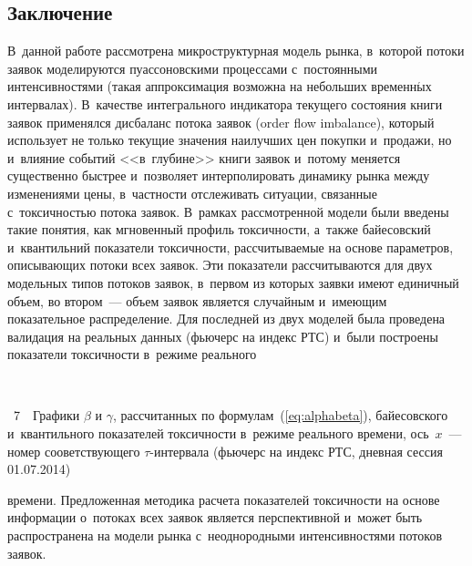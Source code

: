 \begin{multicols}{2}

\section{Заключение}

В~данной работе рассмотрена микроструктурная модель рынка,
в~которой потоки заявок моделируются пуассоновскими процессами
с~постоянными интенсивностями (такая аппроксимация возможна на
небольших временн$\acute{\mbox{ы}}$х интервалах). В~качестве интегрального индикатора
текущего состояния книги заявок применялся дисбаланс потока заявок
(order flow imbalance), который использует не только текущие значения
наилучших цен покупки и~продажи, но и~влияние событий <<в~глубине>>
книги заявок и~потому меняется существенно быст\-рее и~позволяет
интерполировать динамику рынка между изменениями цены, в~частности
отслеживать ситуации, связанные с~токсичностью потока заявок.
В~рамках рассмотренной модели были введены такие понятия,
как мгновенный профиль токсичности, а~так\-же байесовский и~квантильний
показатели токсичности, рассчитываемые на основе параметров, описывающих
потоки всех заявок. Эти показатели рассчитываются для двух модельных типов
потоков заявок, в~первом из которых заявки имеют единичный объем, во втором~---
объем заявок является случайным и~имеющим показательное распределение. Для
последней из двух моделей была проведена валидация на реальных данных
(фьючерс на индекс РТС) и~были построены показатели токсичности в~режиме
реального\linebreak\vspace*{-12pt}
\begin{center}  %
\vspace*{1pt}
 \mbox{%
 \epsfxsize=79.735mm
 }
\end{center}


\noindent
{{\figurename~7}\ \ \small{Графики $\beta$ и $\gamma$, рассчитанных по формулам~(\ref{eq:alphabeta}),
 байесовского и~квантильного показателей токсичности в~режиме реального времени,
 ось~$x$~--- номер сооветствующего $\tau$-ин\-тер\-ва\-ла
 (фьючерс на индекс РТС, дневная сессия 01.07.2014)}}

 \vspace*{13pt}




\noindent
 времени. Предложенная методика расчета показателей токсичности
на основе информации о~потоках всех заявок является перспективной и~может
быть распространена на модели рынка с~неоднородными интенсивностями потоков
заявок.



\end{multicols}
